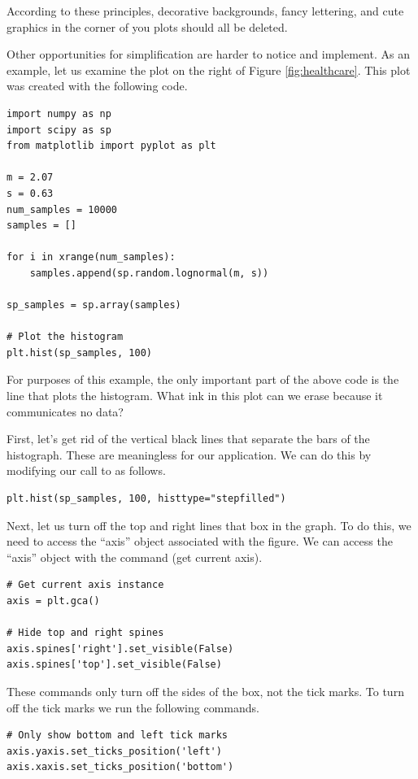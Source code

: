 According to these principles, decorative backgrounds, fancy lettering, and cute graphics in the corner of you plots should all be deleted.

Other opportunities for simplification are harder to notice and implement. As an example, let us examine the plot on the right of Figure \ref{fig:healthcare}. 
This plot was created with the following code.

\begin{lstlisting}
import numpy as np
import scipy as sp
from matplotlib import pyplot as plt

m = 2.07
s = 0.63
num_samples = 10000
samples = []

for i in xrange(num_samples):
    samples.append(sp.random.lognormal(m, s)) 

sp_samples = sp.array(samples)

# Plot the histogram
plt.hist(sp_samples, 100)
\end{lstlisting}

For purposes of this example, the only important part of the above code is the line  that plots the histogram. 
What ink in this plot can we erase because it communicates no data?

First, let's get rid of the vertical black lines that separate the bars of the histograph. 
These are meaningless for our application. 
We can do this by modifying our call to  as follows.

\begin{lstlisting}
plt.hist(sp_samples, 100, histtype="stepfilled")
\end{lstlisting}

Next, let us turn off the top and right lines that box in the graph. 
To do this, we need to access the ``axis'' object associated with the figure. 
We can access the ``axis'' object with the command  (get current axis).

\begin{lstlisting}
# Get current axis instance
axis = plt.gca()

# Hide top and right spines
axis.spines['right'].set_visible(False)
axis.spines['top'].set_visible(False)
\end{lstlisting}

These commands only turn off the sides of the box, not the tick marks. 
To turn off the tick marks we run the following commands. 

\begin{lstlisting}
# Only show bottom and left tick marks
axis.yaxis.set_ticks_position('left')
axis.xaxis.set_ticks_position('bottom')
\end{lstlisting}

